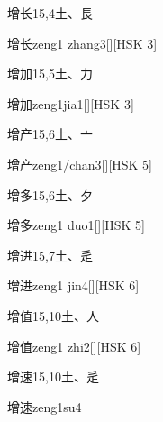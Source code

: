 \begin{Entry}{增长}{15,4}{⼟、⾧}
  \begin{Phonetics}{增长}{zeng1 zhang3}[][HSK 3]
  \end{Phonetics}
\end{Entry}

\begin{Entry}{增加}{15,5}{⼟、⼒}
  \begin{Phonetics}{增加}{zeng1jia1}[][HSK 3]
  \end{Phonetics}
\end{Entry}

\begin{Entry}{增产}{15,6}{⼟、⼇}
  \begin{Phonetics}{增产}{zeng1/chan3}[][HSK 5]
  \end{Phonetics}
\end{Entry}

\begin{Entry}{增多}{15,6}{⼟、⼣}
  \begin{Phonetics}{增多}{zeng1 duo1}[][HSK 5]
  \end{Phonetics}
\end{Entry}

\begin{Entry}{增进}{15,7}{⼟、⾡}
  \begin{Phonetics}{增进}{zeng1 jin4}[][HSK 6]
  \end{Phonetics}
\end{Entry}

\begin{Entry}{增值}{15,10}{⼟、⼈}
  \begin{Phonetics}{增值}{zeng1 zhi2}[][HSK 6]
  \end{Phonetics}
\end{Entry}

\begin{Entry}{增速}{15,10}{⼟、⾡}
  \begin{Phonetics}{增速}{zeng1su4}
  \end{Phonetics}
\end{Entry}

